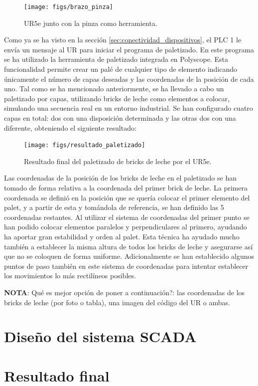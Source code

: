 \begin{figure}[h!]
  \begin{center}
  	\texttt{[image: figs/brazo\_pinza]}
  \end{center}
  \caption{\centering UR5e junto con la pinza como herramienta.}
  \label{fig:brazo_pinza}
\end{figure}

Como ya se ha visto en la sección \ref{sec:conectividad_dispositivos}, el PLC 1 le envía un mensaje al UR para iniciar el programa de paletizado. En este programa se ha utilizado la herramienta de paletizado integrada en Polyscope. Esta funcionalidad permite crear un palé de cualquier tipo de elemento indicando únicamente el número de capas deseadas y las coordenadas de la posición de cada uno. Tal como se ha mencionado anteriormente, se ha llevado a cabo un paletizado por capas, utilizando bricks de leche como elementos a colocar, simulando una secuencia real en un entorno industrial. Se han configurado cuatro capas en total: dos con una disposición determinada y las otras dos con una diferente, obteniendo el siguiente resultado:

\begin{figure}[h!]
  \begin{center}
  	\texttt{[image: figs/resultado\_paletizado]}
  \end{center}
  \caption{\centering Resultado final del paletizado de bricks de leche por el UR5e.}
  \label{fig:resultado_paletizado}
\end{figure}

Las coordenadas de la posición de los bricks de leche en el paletizado se han tomado de forma relativa a la coordenada del primer brick de leche. La primera coordenada se definió en la posición que se quería colocar el primer elemento del palet, y a partir de esta y tomándola de referencia, se han definido las 5 coordenadas restantes. Al utilizar el sistema de coordenadas del primer punto se han podido colocar elementos paralelos y perpendiculares al primero, ayudando ha aportar gran estabilidad y orden al palet. Esta técnica ha ayudado mucho también a establecer la misma altura de todos los bricks de leche y asegurarse así que no se coloquen de forma uniforme. Adicionalmente se han establecido algunos puntos de paso también en este sistema de coordenadas para intentar establecer los movimientos lo más rectilíneos posibles. 

\textbf{NOTA}: Qué es mejor opción de poner a continuación?: las coordenadas de los bricks de leche (por foto o tabla), una imagen del código del UR o ambas.

\clearpage
\section{Diseño del sistema SCADA}
\label{sec:diseño_scada}



\section{Resultado final}
\label{sec:resultado_final}





